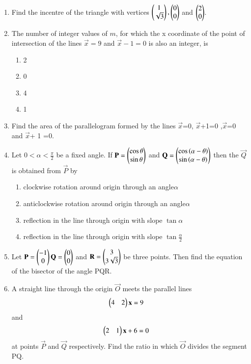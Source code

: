 \begin{enumerate}[label=\arabic*.,ref=\thesubsection.\theenumi]
    \item Find the incentre of the triangle with vertices $\begin{pmatrix}1\\\sqrt{3}\end{pmatrix},\begin{pmatrix}0\\0\end{pmatrix}$ and $\begin{pmatrix}2\\0\end{pmatrix}$. 
    \item The number of integer values of $m$, for which the x coordinate of the point of intersection of the lines $\vec {x}=9$ and $\vec {x} -1=0$  is also an integer, is
    \begin{enumerate}
     \item  2
     \item  0
     \item  4
     \item  1
     \end{enumerate}
    \item Find the area of the parallelogram formed by the lines $\vec {x}$=0, $\vec {x}$+1=0 ,$\vec {x}$=0 and $\vec {x}$+ 1 =0.
    \item Let $0 <\alpha< \frac{\pi}{2}$  be a fixed angle. If
    $\mathbf{P}=\begin{pmatrix}\cos\theta \\ \sin \theta\end{pmatrix}$ and $\mathbf{Q}=\begin{pmatrix}\cos\left(\alpha-\theta\right)\\ \sin\left(\alpha-\theta\right)\end{pmatrix}$
    then the $\vec{Q}$ is obtained from $\vec{ P}$ by
    \begin{enumerate}
     \item  clockwise rotation around origin through an angle$\alpha$
     \item  anticlockwise rotation around origin through an angle$\alpha$
     \item  reflection in the line through origin with slope $\tan \alpha$
     \item  reflection in the line through origin with slope $\tan \frac{\alpha}{2}$
     \end{enumerate}
    \item Let $\mathbf{P}=\begin{pmatrix}-1\\0\end{pmatrix} \mathbf{Q}=\begin{pmatrix}0\\0\end{pmatrix}$ and $\mathbf{R}=\begin{pmatrix}3\\3\sqrt{3}\end{pmatrix}$ be three points. Then find the equation of the bisector of the angle PQR.
    \item A straight line through the origin $\vec{O}$ meets the parallel lines \begin{align} \begin{pmatrix}4 & 2\end{pmatrix} \mathbf {x} &= 9\end{align} and \begin{align} \begin{pmatrix}2 & 1\end{pmatrix} \mathbf {x} + 6 &= 0\end{align} at points $\vec{P}$ and $\vec{Q}$ respectively. Find the ratio in which $\vec{O}$ divides the segment PQ. 

\end{enumerate}
